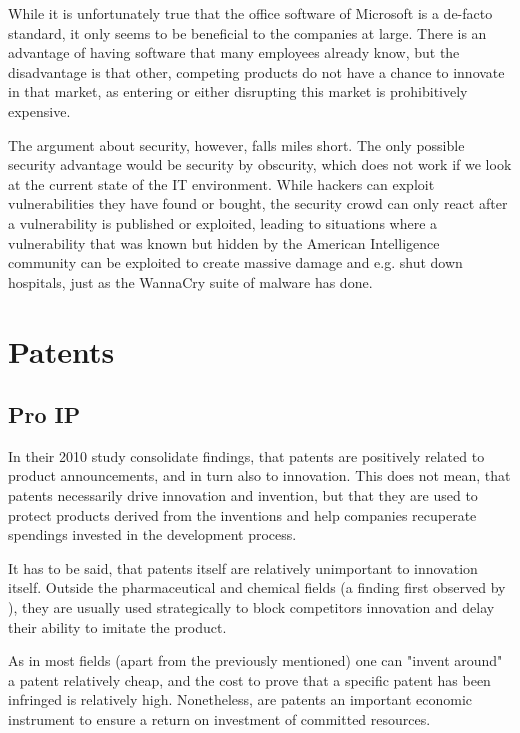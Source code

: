 \documentclass[a4paper]{report}
\begin{document}
While it is unfortunately true that the office software of Microsoft is a de-facto standard, it only seems to be beneficial to the companies at large. There is an advantage of having software that many employees already know, but the disadvantage is that other, competing products do not have a chance to innovate in that market, as entering or either disrupting this market is prohibitively expensive.

The argument about security, however, falls miles short. The only possible security advantage would be security by obscurity, which does not work if we look at the current state of the IT environment. While hackers can exploit vulnerabilities they have found or bought, the security crowd can only react after a vulnerability is published or exploited, leading to situations where a vulnerability that was known but hidden by the American Intelligence community can be exploited to create massive damage and e.g. shut down hospitals, just as the WannaCry suite of malware has done.

\section{Patents}
\label{sec:DiscPatents}

\subsection{Pro IP}
\label{ssec:ProIPPatents}
In their 2010 study \citeauthor{Artz2010} consolidate findings, that patents are positively related to product announcements, and in turn also to innovation. This does not mean, that patents necessarily drive innovation and invention, but that they are used to protect products derived from the inventions and help companies recuperate spendings invested in the development process. 

It has to be said, that patents itself are relatively unimportant to innovation itself. Outside the pharmaceutical and chemical fields (a finding first observed by \citeauthor{Mansfield1986}), they are usually used strategically to block competitors innovation and delay their ability to imitate the product. 

As in most fields (apart from the previously mentioned) one can "invent around" a patent relatively cheap, and the cost to prove that a specific patent has been infringed is relatively high. Nonetheless, are patents an important economic instrument to ensure a return on investment of committed resources.
\end{document}
